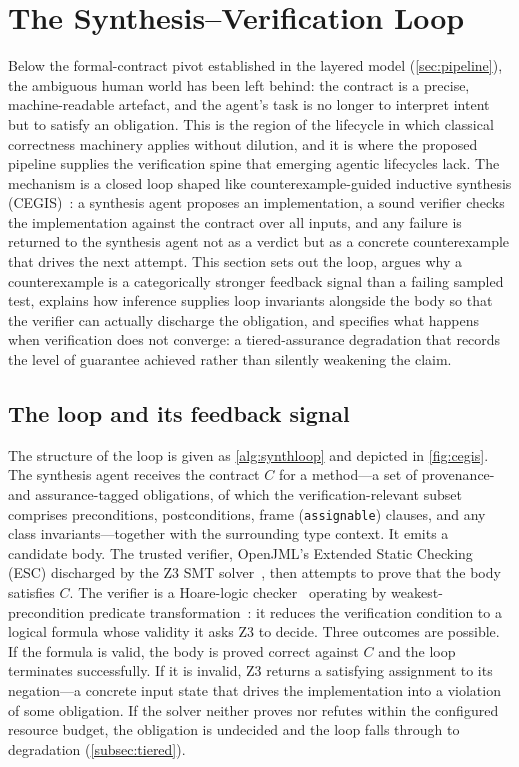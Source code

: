 \section{The Synthesis--Verification Loop}
\label{sec:verification_loop}

Below the formal-contract pivot established in the layered model (\cref{sec:pipeline}), the ambiguous human world has been left behind: the contract is a precise, machine-readable artefact, and the agent's task is no longer to interpret intent but to satisfy an obligation. This is the region of the lifecycle in which classical correctness machinery applies without dilution, and it is where the proposed pipeline supplies the verification spine that emerging agentic lifecycles lack. The mechanism is a closed loop shaped like counterexample-guided inductive synthesis (CEGIS)~\cite{solarlezama2006sketching,solarlezama2008sketching}: a synthesis agent proposes an implementation, a sound verifier checks the implementation against the contract over all inputs, and any failure is returned to the synthesis agent not as a verdict but as a concrete counterexample that drives the next attempt. This section sets out the loop, argues why a counterexample is a categorically stronger feedback signal than a failing sampled test, explains how inference supplies loop invariants alongside the body so that the verifier can actually discharge the obligation, and specifies what happens when verification does not converge: a tiered-assurance degradation that records the level of guarantee achieved rather than silently weakening the claim.

\subsection{The loop and its feedback signal}
\label{subsec:loop_signal}

The structure of the loop is given as \cref{alg:synthloop} and depicted in \cref{fig:cegis}. The synthesis agent receives the contract $C$ for a method---a set of provenance- and assurance-tagged obligations, of which the verification-relevant subset comprises preconditions, postconditions, frame (\texttt{assignable}) clauses, and any class invariants---together with the surrounding type context. It emits a candidate body. The trusted verifier, OpenJML's Extended Static Checking (ESC) discharged by the Z3 SMT solver~\cite{cok2014openjml,demoura2008z3}, then attempts to prove that the body satisfies $C$. The verifier is a Hoare-logic checker~\cite{hoare1969axiomatic} operating by weakest-precondition predicate transformation~\cite{dijkstra1975guarded}: it reduces the verification condition to a logical formula whose validity it asks Z3 to decide. Three outcomes are possible. If the formula is valid, the body is proved correct against $C$ and the loop terminates successfully. If it is invalid, Z3 returns a satisfying assignment to its negation---a concrete input state that drives the implementation into a violation of some obligation. If the solver neither proves nor refutes within the configured resource budget, the obligation is undecided and the loop falls through to degradation (\cref{subsec:tiered}).

